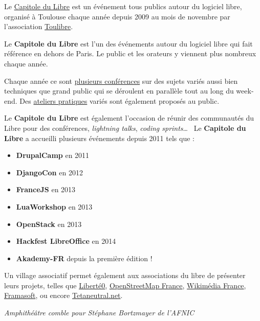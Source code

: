 
Le \href{http://capitoledulibre.org/}{Capitole du Libre} est un
 événement tous publics autour du logiciel libre,
 organisé à Toulouse chaque année depuis 2009 au mois de novembre
 par l'association \href{http://toulibre.org/}{Toulibre}.

Le \textbf{Capitole du Libre} est l'un des événements autour du logiciel libre
 qui fait référence en dehors de Paris. Le public et les orateurs y viennent plus nombreux chaque année.

Chaque année ce sont
 \href{http://2014.capitoledulibre.org/programme/conferences/list/}{plusieurs conférences}
 sur des sujets variés aussi bien techniques que grand public qui se
 déroulent en parallèle tout au long du week-end.
Des \href{http://2014.capitoledulibre.org/programme/ateliers/list/}{ateliers pratiques}
 variés sont également proposés au public.

\Separateur

Le \textbf{Capitole du Libre} est également l'occasion de réunir des 
communautés du Libre pour des conférences, \textit{lightning talks}, 
\textit{coding sprints}\dots ~ Le \textbf{Capitole du Libre} a 
accueilli plusieurs événements depuis 2011 tels que :
\begin{itemize}[label=$\bullet$]
\item \textbf{DrupalCamp} en 2011
\item \textbf{DjangoCon} en 2012
\item \textbf{FranceJS} en 2013
\item \textbf{LuaWorkshop} en 2013
\item \textbf{OpenStack} en 2013
\item \textbf{Hackfest LibreOffice}  en 2014
\item \textbf{Akademy-FR} depuis la première édition !
\end{itemize}

\Separateur

Un village associatif permet également aux associations du libre de
 présenter leurs projets, telles que \href{http://liberte0.org/wiki/index.php?title=Accueil}{Liberté0},
 \href{http://openstreetmap.fr/}{OpenStreetMap France},
 \href{http://wikimedia.fr/}{Wikimédia France},
 \href{http://framasoft.net/}{Framasoft},
 ou encore \href{http://tetaneutral.net/}{Tetaneutral.net}.

\begin{center}
\textit{Amphithéâtre comble pour Stéphane Bortzmayer de l'AFNIC}
\end{center}

